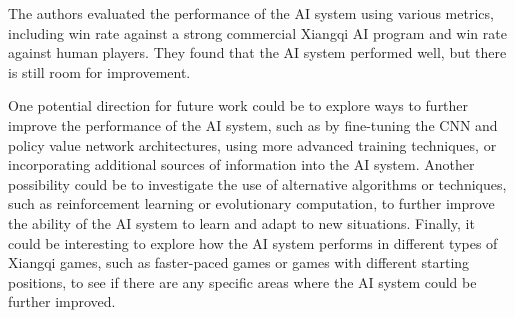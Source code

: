 \documentclass[10pt,twocolumn]{article}
\begin{document}
    The authors evaluated the performance of the AI system using various metrics, including win rate against a strong commercial Xiangqi AI program and win rate against human players. They found that the AI system performed well, but there is still room for improvement.

    One potential direction for future work could be to explore ways to further improve the performance of the AI system, such as by fine-tuning the CNN and policy value network architectures, using more advanced training techniques, or incorporating additional sources of information into the AI system. Another possibility could be to investigate the use of alternative algorithms or techniques, such as reinforcement learning or evolutionary computation, to further improve the ability of the AI system to learn and adapt to new situations. Finally, it could be interesting to explore how the AI system performs in different types of Xiangqi games, such as faster-paced games or games with different starting positions, to see if there are any specific areas where the AI system could be further improved.





\printbibliography 
\end{document}
